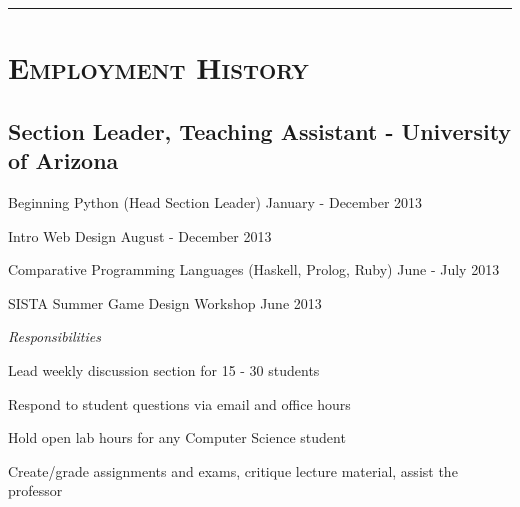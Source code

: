 \documentclass[11pt,letterpaper]{article}
\newcommand{\Hsep}{\vspace{4mm} \hrule \vspace{-1mm}}
\begin{document}
\begin{minipage}{\textwidth}
\Hsep

\section{\scshape Employment History}

\vspace{-2mm}
\subsection{Section Leader, Teaching Assistant - {\small University of Arizona}}
\begin{adjustwidth}{2em}{0pt}

Beginning Python {\small (Head Section Leader)} \hfill January - December 2013

Intro Web Design \hfill August - December 2013

Comparative Programming Languages {\small (Haskell, Prolog, Ruby)} \hfill June - July 2013

SISTA Summer Game Design Workshop \hfill June 2013

\vspace{3mm}
{\large \emph {Responsibilities}}

\hspace{2em}Lead weekly discussion section for 15 - 30 students

\hspace{2em}Respond to student questions via email and office hours

\hspace{2em}Hold open lab hours for any Computer Science student

\hspace{2em}Create/grade assignments and exams, critique lecture material, assist the professor
\end{adjustwidth}

\end{minipage}
\end{document}
